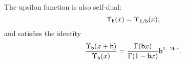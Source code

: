 The upsilon function is also self-dual:
\begin{equation}
    \Upsilon_{\mathsf{b}}(x) = \Upsilon_{1/\mathsf{b}}(x),
\end{equation}
and satisfies the identity
\begin{equation}
    \frac{\Upsilon_{\mathsf{b}}(x+\mathsf{b})}{\Upsilon_{\mathsf{b}}(x)}
        = \frac{\Gamma(\mathsf{b} x)}{\Gamma(1-\mathsf{b} x)} \mathsf{b}^{1-2\mathsf{b} x}.
\label{eq:upsilon_identity}
\end{equation}
















